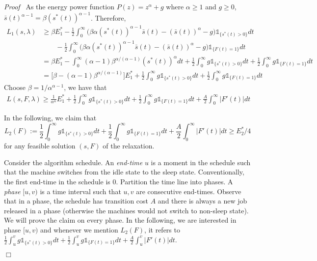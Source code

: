 \documentclass[11pt]{article}
\newenvironment{proof}{\noindent\emph{Proof\ }}{\hspace*{\fill}$\Box$\medskip}
\newcommand{\one}{\ensuremath{\mathds{1}}}
\begin{document}
\begin{proof}
As the energy power function $P(z) = z^{\alpha} + g$ where $\alpha \geq 1$ and $g \geq 0$, 
$\bar{s}(t)^{\alpha-1} = \beta (s^{*}(t))^{\alpha-1}$. Therefore,
\begin{align*}
L_{1}(s,\lambda)  &\geq \beta E^{*}_{1} - \frac{1}{2}\int_{0}^{\infty}  
		\biggl( \beta \alpha (s^{*}(t))^{\alpha-1}  \bar{s}(t) - (\bar{s}(t))^{\alpha} - g \biggl) \one_{\{s^{*}(t) > 0\}} dt \\
		& \qquad - \frac{1}{2}\int_{0}^{\infty}  
		\biggl( \beta \alpha (s^{*}(t))^{\alpha-1}  \bar{s}(t) - (\bar{s}(t))^{\alpha} - g \biggl) \one_{\{F(t) =1\}} dt \\
& = \beta E^{*}_{1} - \int_{0}^{\infty} (\alpha-1) \beta^{\alpha/(\alpha-1)}(s^{*}(t))^{\alpha}dt 
		+ \frac{1}{2} \int_{0}^{\infty} g \one_{\{s^{*}(t) > 0\}} dt 
		+ \frac{1}{2} \int_{0}^{\infty} g \one_{\{F(t) =1\}} dt \\
&= \biggl[ \beta - (\alpha-1) \beta^{\alpha/(\alpha-1)} \biggl] E^{*}_{1} 
	+ \frac{1}{2} \int_{0}^{\infty} g \one_{\{s^{*}(t) > 0\}} dt 
		+ \frac{1}{2} \int_{0}^{\infty} g \one_{\{F(t) =1\}} dt
\end{align*}
Choose $\beta = 1/\alpha^{\alpha-1}$, we have that
\begin{align*}
L(s,F,\lambda) \geq \frac{1}{\alpha^{\alpha}} E^{*}_{1} 
	+ \frac{1}{2} \int_{0}^{\infty} g \one_{\{s^{*}(t) > 0\}} dt 
		+ \frac{1}{2} \int_{0}^{\infty} g \one_{\{F(t) =1\}} dt
	+ \frac{A}{2} \int_{0}^{\infty} |F'(t)|dt
\end{align*}

In the following, we claim that 
$$L_{2}(F) := \frac{1}{2} \int_{0}^{\infty} g \one_{\{s^{*}(t) > 0\}} dt 
		+ \frac{1}{2} \int_{0}^{\infty} g \one_{\{F(t) =1\}} dt + \frac{A}{2} \int_{0}^{\infty} |F'(t)|dt
\geq  E^{*}_{2}/4
$$
for any feasible solution $(s,F)$ of the relaxation.

Consider the algorithm schedule. An \emph{end-time} $u$ is a moment in the schedule such
that the machine switches from the idle state to the sleep state. 
Conventionally, the first end-time in the schedule is 0. 
Partition the time line into phases. A \emph{phase} $[u,v)$ is a time interval such that $u,v$
are consecutive end-times. Observe that in a phase, the schedule
has transition cost $A$ and there is always a new job released in a phase
(otherwise the machines would not switch to non-sleep state).
We will prove the claim on every phase. In the following, 
we are interested in phase $[u,v)$ and whenever we mention $L_{2}(F)$, 
it refers to $\frac{1}{2} \int_{u}^{v} g \one_{\{s^{*}(t) > 0\}} dt 
		+ \frac{1}{2} \int_{u}^{v} g \one_{\{F(t) =1\}} dt + \frac{A}{2} \int_{u}^{v} |F'(t)|dt$. 


\end{proof}
\end{document}
